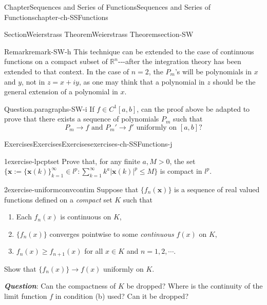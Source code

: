 \documentclass[oneside,10pt,]{book}
\newcommand{\alert}[1]{\textbf{\textit{#1}}}
\numberwithin{equation}{section}
\newcommand{\bx}{\mathbf{x}}
\begin{document}
\begin{chapterptx}{Chapter}{Sequences and Series of Functions}{}{Sequences and Series of Functions}{}{}{chapter-ch-SSFunctions}
\begin{sectionptx}{Section}{Weierstrass Theorem}{}{Weierstrass Theorem}{}{}{section-SW}
\begin{equation*}
\end{equation*}
%
\begin{remark}{Remark}{}{remark-SW-h}%
This technique can be extended to the case of continuous functions on a compact subset of \(\mathbb R^{n}\)-{}-{}-after the integration theory has been extended to that context. In the case of \(n=2\), the \(P_{m}\)'s  will be  polynomials in \(x\) and \(y\), not in \(z=x+iy\), as one may think that a polynomial in \(z\) should be the general extension of a polynomial in \(x\).\end{remark}
\begin{paragraphs}{Question.}{paragraphs-SW-i}%
  If \(f\in C^{1}[a,b]\), can the proof above be adapted to prove that there exists a sequence of polynomials \(P_{m}\) such that%
\begin{equation*}
P_{m}\to f  \text{ and } P_{m}' \to f' \text{ uniformly on } [a, b]?
\end{equation*}
\end{paragraphs}%
\end{sectionptx}
%
%
\typeout{************************************************}
\typeout{************************************************}
%
\begin{exercises-section}{Exercises}{Exercises}{}{Exercises}{}{}{exercises-ch-SSFunctions-j}
\begin{divisionexercise}{1}{}{}{exercise-lpcptset}%
Prove that, for any finite \(a, M > 0\),  the set \(\{ \mathbf x:=\{\mathbf x(k)\}_{k=1}^{\infty}\in l^{p}: \sum_{k=1}^{\infty} k^{a} |\mathbf x(k)|^{p}\le M\}\) is compact in \(l^{p}\).%
\end{divisionexercise}%
\begin{divisionexercise}{2}{}{}{exercise-uniformconvcontim}%
Suppose that \(\{f_n(\bx)\}\) is a sequence of real valued functions defined on a \emph{compact} set \(K\) such that%
\begin{enumerate}[label=(\alph*)]
\item{}Each \(f_n(x)\) is continuous on \(K\),%
\item{}\(\{f_n(x)\}\) converges pointwise to some \emph{continuous} \(f(x)\) on \(K\),%
\item{}\(f_n(x)\ge f_{n+1}(x)\) for all \(x\in K\) and \(n=1, 2, \cdots\).%
\end{enumerate}
Show that \(\{f_n(x)\}\to f(x) \) uniformly on \(K\).%
\par
\alert{Question}: Can  the compactness of \(K\) be dropped? Where is the continuity of the limit function \(f\) in condition (b) used? Can it be dropped?%

\end{divisionexercise}
\end{exercises-section}
\end{chapterptx}
\end{document}
